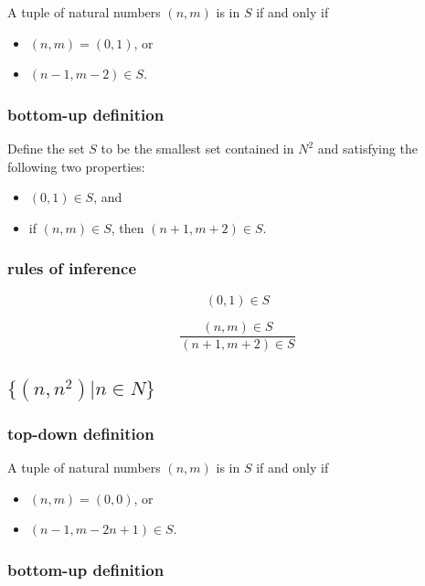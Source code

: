 \documentclass[11pt,a4paper]{article}
\begin{document}
A tuple of natural numbers $(n,m)$ is in $S$ if and only if

\begin{itemize}
    \item{$(n,m) = (0,1)$, or}
    \item{$(n-1,m-2) \in S $.}
\end{itemize}

\subsubsection{bottom-up definition}

Define the set $S$ to be the smallest set contained in $N^2$
and satisfying the following two properties:

\begin{itemize}
    \item{$(0,1) \in S$, and}
    \item{if $(n,m) \in S$, then $(n+1,m+2) \in S$.}
\end{itemize}

\subsubsection{rules of inference}

\begin{equation*}
    (0,1) \in S
\end{equation*}

\begin{equation*}
    \frac
        {(n,m) \in S}
        {(n+1,m+2) \in S}
\end{equation*}

\subsection{$\{(n,n^2)|n \in N\}$}

\subsubsection{top-down definition}

A tuple of natural numbers $(n,m)$ is in $S$ if and only if

\begin{itemize}
    \item{$(n,m) = (0,0)$, or}
    \item{$(n-1,m-2n+1) \in S $.}
\end{itemize}

\subsubsection{bottom-up definition}
\end{document}
